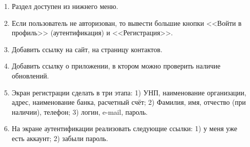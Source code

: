 \begin{enumerate}[label=\thesubsection.\arabic*, leftmargin=3cm]
    \item Раздел доступен из нижнего меню.
    \item Если пользователь не авторизован, то вывести большие кнопки <<Войти в профиль>> (аутентификация) и <<Регистрация>>.
    \item Добавить ссылку на сайт, на страницу контактов.
    \item Добавить ссылку о приложении, в ктором можно проверить наличие обновлений.
    \item Экран регистрации сделать в три этапа:
    1) УНП, наименование организации, адрес, наименование банка, расчетный счёт;
    2) Фамилия, имя, отчество (при наличии), телефон;
    3) логин, e-mail, пароль.
    \item На экране аутентификации реализовать следующие ссылки:
    1) у меня уже есть аккаунт;
    2) забыли пароль.
\end{enumerate}
